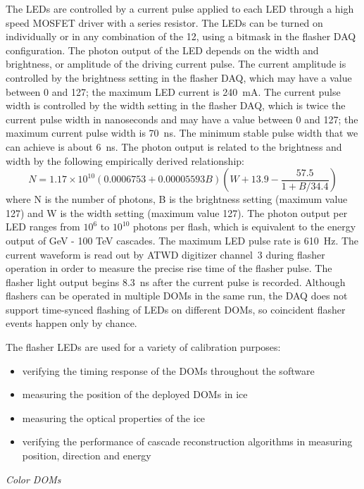 The LEDs are controlled by a current pulse applied to each LED through
a high speed MOSFET driver with a series resistor. The LEDs can be turned on individually or in any
combination of the 12, using a bitmask in the flasher DAQ
configuration. The photon output of the LED depends on the width and
brightness, or
amplitude of
the driving current pulse. The current amplitude is controlled by the
brightness setting in the flasher DAQ, which may have a value between
0 and 127; the maximum LED
current is 240~mA. The current pulse width is controlled by the width
setting in the flasher DAQ, which is twice the current pulse width in
nanoseconds and may have a value between 0 and 127; the maximum current pulse width is 70~ns. The
minimum stable pulse width that we can achieve is about 6~ns. The
photon output is related to the brightness  and width by the following
empirically derived relationship:
\begin{equation}
N = 1.17 \times 10^{10} \left (0.0006753 + 0.00005593B \right ) \left
  (W + 13.9 - \frac{57.5}{1 + B/34.4} \right )
\end{equation}
where N is the number of photons, B is the brightness setting (maximum
value 127) and W is the width setting (maximum value 127). The photon
output per LED ranges from $10^6$ to $10^{10}$ photons per flash,
which is equivalent to the energy output of GeV - 100 TeV cascades. The maximum
LED pulse rate is 610~Hz. The current waveform is read out by ATWD
digitizer channel~3 during flasher operation in order to measure the
precise rise time of the flasher pulse. The flasher light output
begins 8.3~ns after the current pulse is recorded. Although flashers can be
operated in multiple DOMs in the same run, the DAQ does not support
time-synced flashing of LEDs on different DOMs, so coincident flasher
events happen only by chance. 

The flasher LEDs are used for a variety of calibration purposes:
\begin{itemize}
\item verifying the timing response of the DOMs throughout the
  software
\item measuring the position of the deployed DOMs in ice
\item measuring the optical properties of the ice
\item verifying the performance of cascade reconstruction algorithms
  in measuring position, direction and energy
\end{itemize}

{\it Color DOMs}

